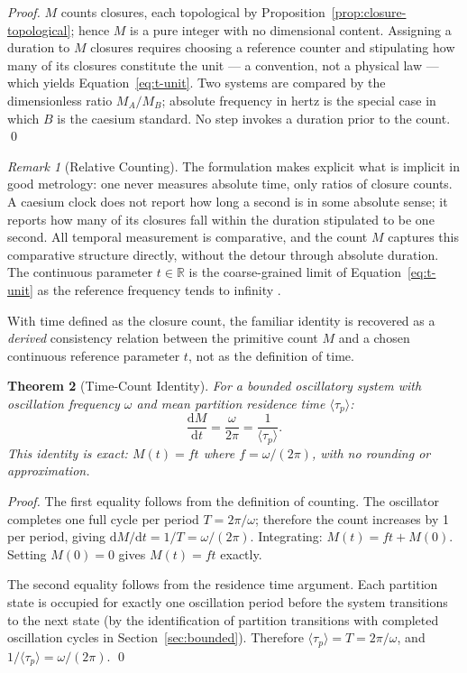 \documentclass[twocolumn,10pt,a4paper]{article}
\theoremstyle{thmstyle}
\newtheorem{theorem}{Theorem}[section]
\theoremstyle{definition}
\theoremstyle{remark}
\newtheorem{remark}[theorem]{Remark}
\newcommand{\R}{\mathbb{R}}
\newcommand{\tp}{\langle\tau_{p}\rangle}
\newcommand{\dM}{\mathrm{d}M}
\newcommand{\dt}{\mathrm{d}t}
\begin{document}
\begin{proof}
$M$ counts closures, each topological by
Proposition~\ref{prop:closure-topological}; hence $M$ is a pure integer with no
dimensional content. Assigning a duration to $M$ closures requires choosing a
reference counter and stipulating how many of its closures constitute the unit
--- a convention, not a physical law --- which yields
Equation~\eqref{eq:t-unit}. Two systems are compared by the dimensionless ratio
$M_A/M_B$; absolute frequency in hertz is the special case in which $B$ is the
caesium standard. No step invokes a duration prior to the count. \qed
\end{proof}

\begin{remark}[Relative Counting]
\label{rem:relative-counting}
The formulation makes explicit what is implicit in good metrology: one never
measures absolute time, only ratios of closure counts. A caesium clock does not
report how long a second is in some absolute sense; it reports how many of its
closures fall within the duration stipulated to be one second. All temporal
measurement is comparative, and the count $M$ captures this comparative
structure directly, without the detour through absolute duration. The continuous
parameter $t \in \R$ is the coarse-grained limit of Equation~\eqref{eq:t-unit}
as the reference frequency tends to infinity \citep{arnold1989}.
\end{remark}

With time defined as the closure count, the familiar identity is recovered as a
\emph{derived} consistency relation between the primitive count $M$ and a chosen
continuous reference parameter $t$, not as the definition of time.

\begin{theorem}[Time-Count Identity]
\label{thm:time-count}
For a bounded oscillatory system with oscillation frequency $\omega$ and mean partition residence time $\tp$:
\begin{equation}
    \frac{\dM}{\dt} = \frac{\omega}{2\pi} = \frac{1}{\tp}.
    \label{eq:time-count}
\end{equation}
This identity is exact: $M(t) = ft$ where $f = \omega/(2\pi)$, with no rounding or approximation.
\end{theorem}

\begin{proof}
The first equality follows from the definition of counting. The oscillator completes one full cycle per period $T = 2\pi/\omega$; therefore the count increases by 1 per period, giving $\dM/\dt = 1/T = \omega/(2\pi)$. Integrating: $M(t) = ft + M(0)$. Setting $M(0) = 0$ gives $M(t) = ft$ exactly.

The second equality follows from the residence time argument. Each partition state is occupied for exactly one oscillation period before the system transitions to the next state (by the identification of partition transitions with completed oscillation cycles in Section~\ref{sec:bounded}). Therefore $\tp = T = 2\pi/\omega$, and $1/\tp = \omega/(2\pi)$. \qed
\end{proof}
\end{document}
